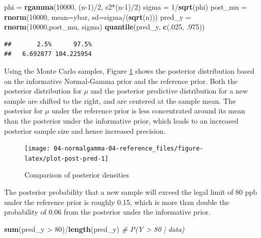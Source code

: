 \documentclass[]{book}
\newenvironment{Shaded}{\begin{snugshade}}{\end{snugshade}}
\newcommand{\KeywordTok}[1]{\textcolor[rgb]{0.13,0.29,0.53}{\textbf{{#1}}}}
\newcommand{\DataTypeTok}[1]{\textcolor[rgb]{0.13,0.29,0.53}{{#1}}}
\newcommand{\DecValTok}[1]{\textcolor[rgb]{0.00,0.00,0.81}{{#1}}}
\newcommand{\StringTok}[1]{\textcolor[rgb]{0.31,0.60,0.02}{{#1}}}
\newcommand{\CommentTok}[1]{\textcolor[rgb]{0.56,0.35,0.01}{\textit{{#1}}}}
\newcommand{\NormalTok}[1]{{#1}}
\theoremstyle{definition}
\theoremstyle{definition}
\theoremstyle{definition}
\theoremstyle{remark}
\begin{document}
\begin{Shaded}
\begin{Highlighting}[]
\NormalTok{phi =}\StringTok{ }\KeywordTok{rgamma}\NormalTok{(}\DecValTok{10000}\NormalTok{, (n}\DecValTok{-1}\NormalTok{)/}\DecValTok{2}\NormalTok{, s2*(n}\DecValTok{-1}\NormalTok{)/}\DecValTok{2}\NormalTok{)}
\NormalTok{sigma =}\StringTok{ }\DecValTok{1}\NormalTok{/}\KeywordTok{sqrt}\NormalTok{(phi)}
\NormalTok{post_mu =}\StringTok{ }\KeywordTok{rnorm}\NormalTok{(}\DecValTok{10000}\NormalTok{, }\DataTypeTok{mean=}\NormalTok{ybar, }\DataTypeTok{sd=}\NormalTok{sigma/(}\KeywordTok{sqrt}\NormalTok{(n)))}
\NormalTok{pred_y =}\StringTok{  }\KeywordTok{rnorm}\NormalTok{(}\DecValTok{10000}\NormalTok{,post_mu, sigma)}
\KeywordTok{quantile}\NormalTok{(pred_y, }\KeywordTok{c}\NormalTok{(.}\DecValTok{025}\NormalTok{, .}\DecValTok{975}\NormalTok{))}
\end{Highlighting}
\end{Shaded}

\begin{verbatim}
##       2.5%      97.5% 
##   6.692877 104.225954
\end{verbatim}

Using the Monte Carlo samples, Figure \ref{fig:plot-post-pred} shows the
posterior distribution based on the informative Normal-Gamma prior and
the reference prior. Both the posterior distribution for \(\mu\) and the
posterior predictive distribution for a new sample are shifted to the
right, and are centered at the sample mean. The posterior for \(\mu\)
under the reference prior is less concentrated around its mean than the
posterior under the informative prior, which leads to an increased
posterior sample size and hence increased precision.

\begin{figure}

{\centering \texttt{[image: 04-normalgamma-04-reference\_files/figure-latex/plot-post-pred-1]} 

}

\caption{Comparison of posterior densities}\label{fig:plot-post-pred}
\end{figure}

The posterior probability that a new sample will exceed the legal limit
of 80 ppb under the reference prior is roughly 0.15, which is more than
double the probability of 0.06 from the posterior under the informative
prior.

\begin{Shaded}
\begin{Highlighting}[]
\KeywordTok{sum}\NormalTok{(pred_y >}\StringTok{ }\DecValTok{80}\NormalTok{)/}\KeywordTok{length}\NormalTok{(pred_y)  }\CommentTok{# P(Y > 80 | data)}
\end{Highlighting}
\end{Shaded}
\end{document}
